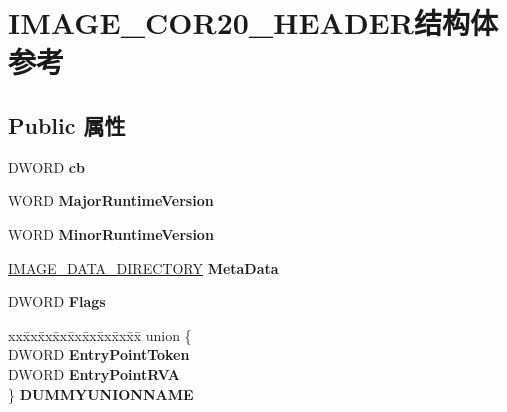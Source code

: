 \hypertarget{struct_i_m_a_g_e___c_o_r20___h_e_a_d_e_r}{}\section{I\+M\+A\+G\+E\+\_\+\+C\+O\+R20\+\_\+\+H\+E\+A\+D\+E\+R结构体 参考}
\label{struct_i_m_a_g_e___c_o_r20___h_e_a_d_e_r}
\subsection*{Public 属性}
\begin{DoxyCompactItemize}
\item 
\mbox{\label{struct_i_m_a_g_e___c_o_r20___h_e_a_d_e_r_a4416734205043c0ceb08ce9a52eb2bbc}} 
D\+W\+O\+RD {\bfseries cb}
\item 
\mbox{\label{struct_i_m_a_g_e___c_o_r20___h_e_a_d_e_r_a3fd78930fc21d45b8632a8fd73a97144}} 
W\+O\+RD {\bfseries Major\+Runtime\+Version}
\item 
\mbox{\label{struct_i_m_a_g_e___c_o_r20___h_e_a_d_e_r_a020a160f3e77b72da2e864417c24ed54}} 
W\+O\+RD {\bfseries Minor\+Runtime\+Version}
\item 
\mbox{\label{struct_i_m_a_g_e___c_o_r20___h_e_a_d_e_r_af4da5997485665ec4aa34461ac9466a7}} 
\hyperlink{struct___i_m_a_g_e___d_a_t_a___d_i_r_e_c_t_o_r_y}{I\+M\+A\+G\+E\+\_\+\+D\+A\+T\+A\+\_\+\+D\+I\+R\+E\+C\+T\+O\+RY} {\bfseries Meta\+Data}
\item 
\mbox{\label{struct_i_m_a_g_e___c_o_r20___h_e_a_d_e_r_a68a3cb827e00524694a48b1549d5e941}} 
D\+W\+O\+RD {\bfseries Flags}
\item 
\mbox{\label{struct_i_m_a_g_e___c_o_r20___h_e_a_d_e_r_a62f1d134603e54276a5d5c63f42142e0}} 
\begin{tabbing}
xx\=xx\=xx\=xx\=xx\=xx\=xx\=xx\=xx\=\kill
union \{\\
\>DWORD {\bfseries EntryPointToken}\\
\>DWORD {\bfseries EntryPointRVA}\\
\} {\bfseries DUMMYUNIONNAME}\\


\end{tabbing}
\end{DoxyCompactItemize}
